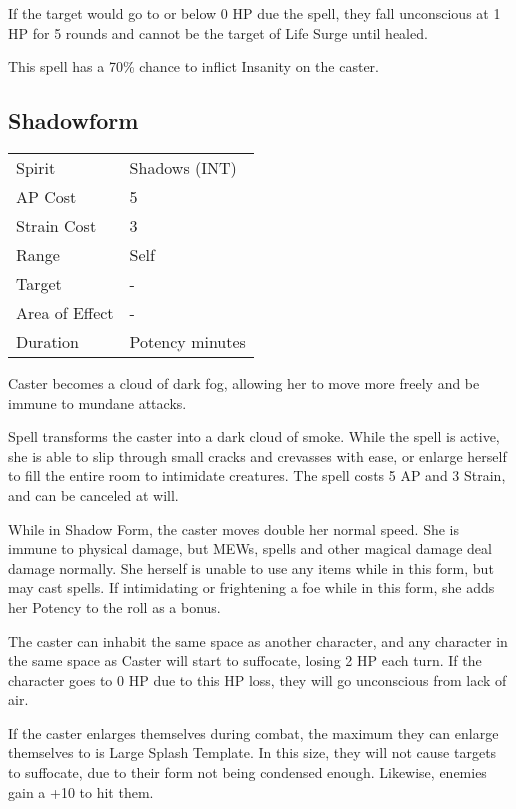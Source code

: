 \documentclass[11pt,a4paper,twocolumn]{book}
\begin{document}
If the target would go to or below 0 HP due the spell, they fall unconscious at 1 HP for 5 rounds and cannot be the target of Life Surge until healed.

This spell has a 70\% chance to inflict Insanity on the caster.


\subsection*{Shadowform}

{
	\begin{tabu} to 75mm{| X[l,4] | X[l,7] |}
		\hline
		Spirit 			& Shadows (INT) 		\\
		AP Cost	      	& 5 					\\
		Strain Cost     & 3 					\\
		Range     		& Self					\\
		Target      	& -						\\
		Area of Effect  & -  	 				\\
		Duration     	& Potency minutes		\\ \hline
	\end{tabu}
	
}

\medskip

Caster becomes a cloud of dark fog, allowing her to move more freely and be immune to mundane attacks. 	

Spell transforms the caster into a dark cloud of smoke. While the spell is active, she is able to slip through small cracks and crevasses with ease, or enlarge herself to fill the entire room to intimidate creatures. The spell costs 5 AP and 3 Strain, and can be canceled at will.

While in Shadow Form, the caster moves double her normal speed. She is immune to physical damage, but MEWs, spells and other magical damage deal damage normally. She herself is unable to use any items while in this form, but may cast spells. If intimidating or frightening a foe while in this form, she adds her Potency to the roll as a bonus.

The caster can inhabit the same space as another character, and any character in the same space as Caster will start to suffocate, losing 2 HP each turn. If the character goes to 0 HP due to this HP loss, they will go unconscious from lack of air.

If the caster enlarges themselves during combat, the maximum they can enlarge themselves to is Large Splash Template. In this size, they will not cause targets to suffocate, due to their form not being condensed enough. Likewise, enemies gain a +10 to hit them.
\end{document}
